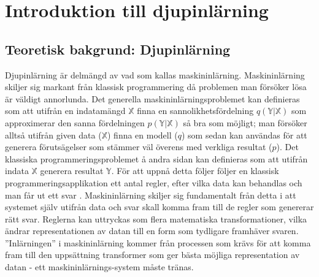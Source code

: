 \section{Introduktion till djupinlärning}




\subsection{Teoretisk bakgrund: Djupinlärning}

Djupinlärning är delmängd av vad som kallas maskininlärning. Maskininlärning skiljer sig markant från klassisk programmering då problemen man försöker lösa är väldigt annorlunda. Det generella maskininlärningsproblemet kan definieras som att utifrån en indatamängd $\mathbb{X}$ finna en sannolikhetsfördelning $q\left(\mathbb{Y}|\mathbb{X}\right)$ som approximerar den sanna fördelningen $p\left(\mathbb{Y}|\mathbb{X}\right)$ så bra som möjligt; man försöker alltså utifrån given data ($\mathbb{X}$) finna en modell ($q$) som sedan kan användas för att generera förutsägelser som stämmer väl överens med verkliga resultat ($p$). Det klassiska programmeringsproblemet å andra sidan kan definieras som att utifrån indata $\mathbb{X}$ generera resultat $\mathbb{Y}$. För att uppnå detta följer följer en klassisk programmeringsapplikation ett antal regler, efter vilka data kan behandlas och man får ut ett svar \cite{Chollet}. Maskininlärning skiljer sig fundamentalt från detta i att systemet själv utifrån data och svar skall komma fram till de regler som genererar rätt svar. Reglerna kan uttryckas som flera matematiska transformationer, vilka ändrar representationen av datan till en form som tydligare framhäver svaren. ''Inlärningen'' i maskininlärning kommer från processen som krävs för att komma fram till den uppsättning transformer som ger bästa möjliga representation av datan - ett maskininlärnings-system måste tränas.

